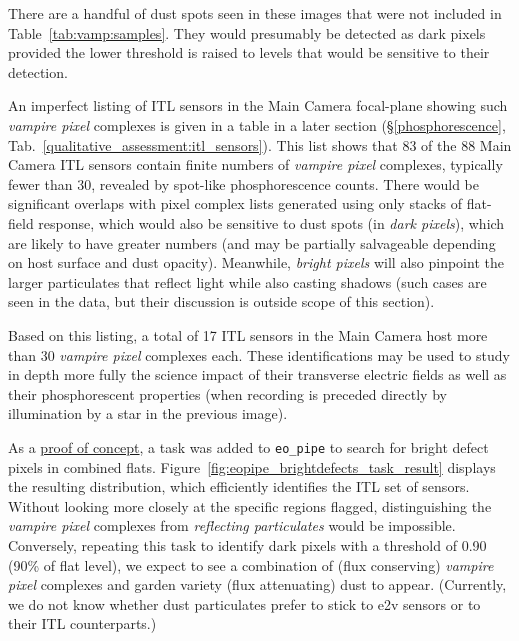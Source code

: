 There are a handful of dust spots seen in these images that were not included in Table~\ref{tab:vamp:samples}. They would presumably be detected as dark pixels provided the lower threshold is raised to levels that would be sensitive to their detection.


%
%

An imperfect listing of ITL sensors in the Main Camera focal-plane showing such {\it vampire pixel} complexes is given in a table in a later section (\S\ref{phosphorescence}, Tab.~\ref{qualitative_assessment:itl_sensors}). This list shows that 83 of the 88 Main Camera ITL sensors contain finite numbers of {\it vampire pixel} complexes, typically fewer than 30, revealed by spot-like phosphorescence counts. There would be significant overlaps with pixel complex lists generated using only stacks of flat-field response, which would also be sensitive to dust spots (in {\it dark pixels}), which are likely to have greater numbers (and may be partially salvageable depending on host surface and dust opacity). Meanwhile, {\it bright pixels} will also pinpoint the larger particulates that reflect light while also casting shadows (such cases are seen in the data, but their discussion is outside scope of this section). 

Based on this listing, a total of 17 ITL sensors in the Main Camera host more than 30 {\it vampire pixel} complexes each. These identifications may be used to study in depth more fully the science impact of their transverse electric fields as well as their phosphorescent properties (when recording is preceded directly by illumination by a star in the previous image).

As a \href{https://rubin-obs.slack.com/archives/C07QJMQAP6E/p1731348605966989?thread_ts=1730921120.364949&cid=C07QJMQAP6E}{proof of concept}, a task was added to {\tt eo\_pipe} to search for bright defect pixels in combined flats. Figure~\ref{fig:eopipe_brightdefects_task_result} displays the resulting distribution, which efficiently identifies the ITL set of sensors. Without looking more closely at the specific regions flagged, distinguishing the {\it vampire pixel} complexes from {\it reflecting particulates} would be impossible. Conversely, repeating this task to identify dark pixels with a threshold of 0.90 (90\% of flat level), we expect to see a combination of (flux conserving) {\it vampire pixel} complexes and garden variety (flux attenuating) dust to appear. (Currently, we do not know whether dust particulates prefer to stick to e2v sensors or to their ITL counterparts.)

